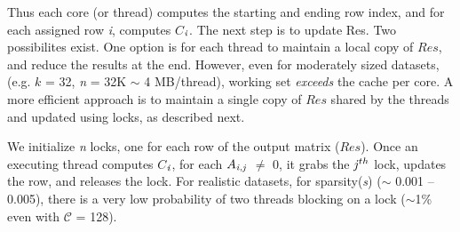 
     Thus each core (or thread) 
     computes the starting and ending row
     index, and for each assigned row {\it{i}}, computes
     $C$$_{{\it{i}}}$. The next step is to update Res.
     Two possibilites exist. One option is for each thread
     to maintain a local copy of $Res$, and reduce the results at the
     end.
     However, even for moderately sized datasets, (e.g. $k$ = 32,
     {\it{n}} = 32K %
    $\sim$  
     4 MB/thread), working set 
     {\it{exceeds}} the cache per core.
     A more efficient approach is to maintain a
     single copy of $Res$ shared by the threads and updated using
     locks, as described next.

     We initialize {\it{n}} locks, one for each row of the output
     matrix ($Res$).
     Once an executing thread computes $C$$_{{\it{i}}}$,
     for each  $A_{{\it{i}},{\it{j}}}$ $\neq$ 0, it grabs the
     ${\it{j}}^{th}$ lock, updates the row, and releases the lock. 
     For realistic datasets, for sparsity({\it{s}})
     ($\sim$
     0.001 -- 0.005), there is a very low probability of two threads
     blocking on a lock ($\sim$1\% even with ${\mathcal{C}}$ =
     128). 


